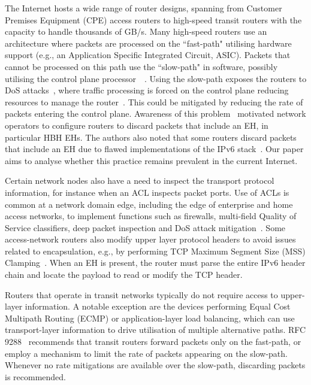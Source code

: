 \documentclass[conference]{IEEEtran}
\begin{document}
The Internet hosts a wide range of router designs, spanning from Customer
Premises Equipment (CPE) access routers to high-speed transit routers with the
capacity to handle thousands of GB/s.  Many high-speed routers use an
architecture where packets are processed on the ``fast-path" utilising hardware
support (e.g., an Application Specific Integrated Circuit, ASIC). Packets that
cannot be processed on this path use the ``slow-path" in software, possibly
utilising the control plane processor~\cite{RFC3654}~\cite{ietf-v6ops-hbh-03}.
Using the slow-path exposes the routers to DoS
attacks~\cite{naagas2021deh}, where traffic processing is forced on the control
plane reducing resources to manage the router~\cite{router-architecture}. This
could be mitigated  by reducing the rate of packets entering the control plane.
Awareness of this problem~\cite{passive-threats} motivated network
operators to configure routers to discard packets that include an EH, in
particular HBH EHs. The authors also noted that some routers discard packets
that include an EH due to flawed implementations of the IPv6
stack~\cite{passive-threats}.  Our paper aims to analyse whether this practice
remains prevalent in the current Internet.

Certain network nodes also have a need to inspect the transport protocol
information, for instance when an ACL inspects packet ports.
Use of ACLs is common at a network domain edge, including the edge of enterprise
and home access networks, to implement functions such as firewalls, multi-field Quality of Service
classifiers, deep packet inspection and DoS attack
mitigation~\cite{lb-classification}. Some access-network routers also modify
upper layer protocol headers to avoid issues related to encapsulation, e.g.,
by performing TCP Maximum Segment Size (MSS) Clamping~\cite{custura-mtu}. When
an EH is present, the router must parse the entire IPv6 header
chain and locate the payload to read or modify the TCP header. 

Routers that operate in transit networks typically do not require access to
upper-layer information. A notable exception are the devices performing Equal
Cost Multipath Routing (ECMP) or application-layer load balancing, which can use
transport-layer information to drive utilisation of multiple alternative
paths. RFC 9288~\cite{rfc9288} recommends that transit routers forward packets
only on the fast-path, or employ a mechanism to limit the rate of packets
appearing on the slow-path.  Whenever no rate mitigations are available over
the slow-path, discarding packets is recommended. 
\end{document}
